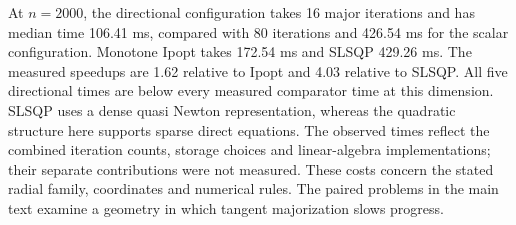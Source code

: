 \documentclass[pdflatex,sn-mathphys-num]{sn-jnl}
\theoremstyle{thmstyleone}
\theoremstyle{thmstylethree}
\newenvironment{scaledtable}[1][tbp]{\begin{tableorg}[#1]\centering}{\end{tableorg}}
\begin{document}
\begin{scaledtable}[tb]
\centering\small
\caption{Median numerical solve times in milliseconds over five solves
of \eqref{eq:radial-family}, with major iterations in parentheses.
All final points satisfy the original KKT tolerance $10^{-8}$.}
\label{tab:radial-times}
\end{scaledtable}


At $n=2000$, the directional configuration takes 16 major iterations
and has median time 106.41 ms, compared with 80 iterations and
426.54 ms for the scalar configuration. Monotone Ipopt takes
172.54 ms and SLSQP 429.26 ms.
The measured speedups are 1.62 relative to Ipopt
and 4.03 relative to SLSQP. All five directional
times are below every measured comparator time at this dimension.
SLSQP uses a dense quasi Newton representation, whereas the quadratic
structure here supports sparse direct equations. The observed times
reflect the combined iteration counts, storage choices and linear-algebra
implementations; their separate contributions were not measured.
These costs concern the stated radial family, coordinates and numerical rules. The paired problems in the main text examine
a geometry in which tangent majorization slows progress.
\end{document}
